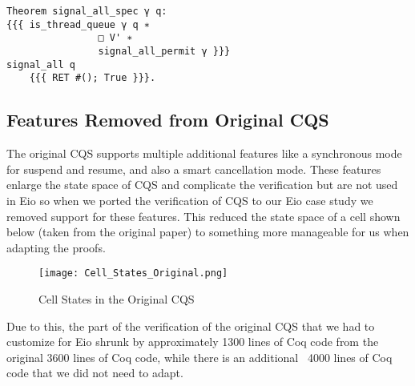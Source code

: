 \begin{verbatim}
Theorem signal_all_spec γ q:
{{{ is_thread_queue γ q ∗
                □ V' ∗
                signal_all_permit γ }}}
signal_all q
    {{{ RET #(); True }}}.
\end{verbatim}

\subsection{Features Removed from Original CQS}
\label{sec:cqs-spec-removed-features}

The original CQS supports multiple additional features like a synchronous mode for suspend and resume, and also a smart cancellation mode.
These features enlarge the state space of CQS and complicate the verification but are not used in Eio so when we ported the verification of CQS to our Eio case study we removed support for these features.
This reduced the state space of a cell shown below (taken from the original paper) to something more manageable for us when adapting the proofs.

\begin{figure}[ht]
  \texttt{[image: Cell\_States\_Original.png]}
  \caption{Cell States in the Original CQS}
\end{figure}

Due to this, the part of the verification of the original CQS that we had to customize for Eio shrunk by approximately 1300 lines of Coq code from the original 3600 lines of Coq code, while there is an additional ~4000 lines of Coq code that we did not need to adapt.
